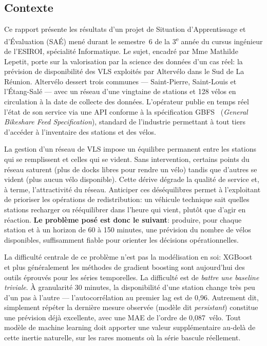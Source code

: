 \documentclass[fleqn, 12pt]{scrartcl}
\newcommand{\ent}{Altervélo}
\begin{document}
\subsection*{Contexte}

Ce rapport présente les résultats d'un projet de Situation d'Apprentissage et d'Évaluation (SAÉ) mené durant le semestre~6 de la 3\textsuperscript{e} année du cursus ingénieur de l'ESIROI, spécialité Informatique. Le sujet, encadré par Mme Mathilde Lepetit, porte sur la valorisation par la science des données d'un cas réel: la prévision de disponibilité des VLS exploités par \ent{} dans le Sud de La Réunion.
%
\ent{} dessert trois communes --- Saint-Pierre, Saint-Louis et l'Étang-Salé --- avec un réseau d'une vingtaine de stations et 128 vélos en circulation à la date de collecte des données.
%
L'opérateur publie en temps réel l'état de son service via une API conforme à la spécification GBFS~\cite{gbfs_spec} (\textit{General Bikeshare Feed Specification}), standard de l'industrie permettant à tout tiers d'accéder à l'inventaire des stations et des vélos.

\vspace{0.3cm}

La gestion d'un réseau de VLS impose un équilibre permanent entre les stations qui se remplissent et celles qui se vident. Sans intervention, certains points du réseau saturent (plus de docks libres pour rendre un vélo) tandis que d'autres se vident (plus aucun vélo disponible). Cette dérive dégrade la qualité de service et, à terme, l'attractivité du réseau.
%
Anticiper ces déséquilibres permet à l'exploitant de prioriser les opérations de redistribution: un véhicule technique sait quelles stations recharger ou rééquilibrer dans l'heure qui vient, plutôt que d'agir en réaction.
%
\textbf{Le problème posé est donc le suivant}: produire, pour chaque station et à un horizon de 60 à 150 minutes, une prévision du nombre de vélos disponibles, suffisamment fiable pour orienter les décisions opérationnelles.

\vspace{0.3cm}

La difficulté centrale de ce problème n'est pas la modélisation en soi: XGBoost~\cite{chen_xgboost_2016} et plus généralement les méthodes de gradient boosting sont aujourd'hui des outils éprouvés pour les séries temporelles. La difficulté est de \emph{battre une baseline triviale}. À granularité 30 minutes, la disponibilité d'une station change très peu d'un pas à l'autre --- l'autocorrélation au premier lag est de 0{,}96. Autrement dit, simplement répéter la dernière mesure observée (modèle dit \emph{persistant}) constitue une prévision déjà excellente, avec une MAE de l'ordre de 0{,}087~vélo. Tout modèle de machine learning doit apporter une valeur supplémentaire au-delà de cette inertie naturelle, sur les rares moments où la série bascule réellement.
\end{document}
